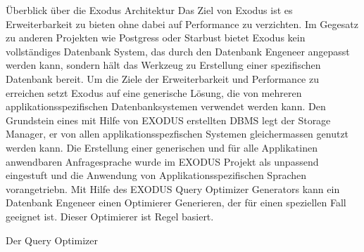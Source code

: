 Überblick über die Exodus Architektur
Das Ziel von Exodus ist es Erweiterbarkeit zu bieten ohne dabei auf Performance zu verzichten. Im Gegesatz zu anderen Projekten wie Postgress oder Starbust bietet Exodus kein vollständiges Datenbank System, das durch den Datenbank Engeneer angepasst werden kann, sondern hält das Werkzeug zu Erstellung einer spezifischen Datenbank bereit.
Um die Ziele der Erweiterbarkeit und Performance zu erreichen setzt Exodus auf eine generische Lösung, die von mehreren applikationsspezifischen Datenbanksystemen verwendet werden kann. Den Grundstein eines mit Hilfe von EXODUS erstellten \ac{DBMS} legt der Storage Manager, er von allen applikationsspezfischen Systemen gleichermassen genutzt werden kann. Die Erstellung einer generischen und für alle Applikatinen anwendbaren Anfragesprache wurde im EXODUS Projekt als unpassend eingestuft und die Anwendung von Applikationsspezifischen Sprachen  vorangetriebn. Mit Hilfe des EXODUS Query Optimizer Generators kann ein Datenbank  Engeneer einen Optimierer Generieren, der für einen speziellen Fall geeignet ist. Dieser Optimierer ist Regel basiert. 

Der Query Optimizer

